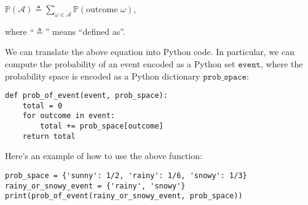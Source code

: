 \documentclass[6008notes.tex]{subfiles}
\begin{document}
$\mathbb {P}(\mathcal{A})\triangleq \sum _{\omega \in \mathcal{A}}\mathbb {P}(\text {outcome }\omega )$,
 
where ``$\triangleq$'' means ``defined as''.

We can translate the above equation into Python code. In particular, we can compute the probability of an event encoded as a Python set $\texttt{event}$, where the probability space is encoded as a Python dictionary $\texttt{prob\_space}$:

\begin{lstlisting}
def prob_of_event(event, prob_space):
    total = 0
    for outcome in event:
        total += prob_space[outcome]
    return total
\end{lstlisting}

Here's an example of how to use the above function:

\begin{lstlisting}
prob_space = {'sunny': 1/2, 'rainy': 1/6, 'snowy': 1/3}
rainy_or_snowy_event = {'rainy', 'snowy'}
print(prob_of_event(rainy_or_snowy_event, prob_space))
\end{lstlisting}
\end{document}

